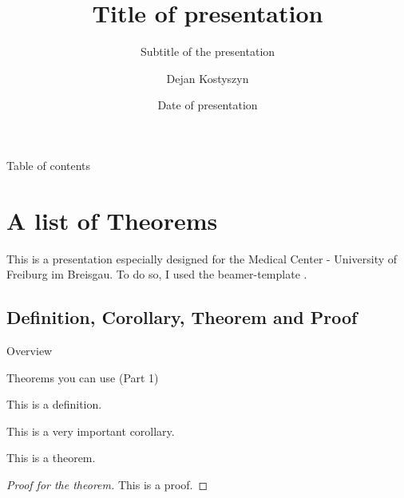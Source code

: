 

\author[Kostyszyn]{Dejan Kostyszyn}
\date{Date of presentation}
\title{Title of presentation}
\subtitle{Subtitle of the presentation}


\begin{frame}
	\titlepage
\end{frame}


\begin{frame}{Table of contents}
\tableofcontents[sectionstyle=show/show]
\end{frame}


\section[Theorems]{A list of Theorems}
\begin{frame}
	This is a presentation especially designed for the Medical Center - University of Freiburg im Breisgau. To do so, I used the beamer-template \cite{ctan_beamer}.
\end{frame}


\subsection[Def., Cor., Thm., Proof]{Definition, Corollary, Theorem and Proof}

\begin{frame}{Overview}
\tableofcontents[currentsubsection]
\end{frame}

\begin{frame}{Theorems you can use (Part 1)}
	\begin{definition}[A definition]
		This is a definition.
	\end{definition}
	\begin{corollary}
		This is a \alert{very important} corollary.
	\end{corollary}
    \begin{theorem}[A theorem]
    	This is a theorem.
    \end{theorem}
    \begin{proof}[Proof for the theorem]
    	This is a proof.
    \end{proof}
\end{frame}


